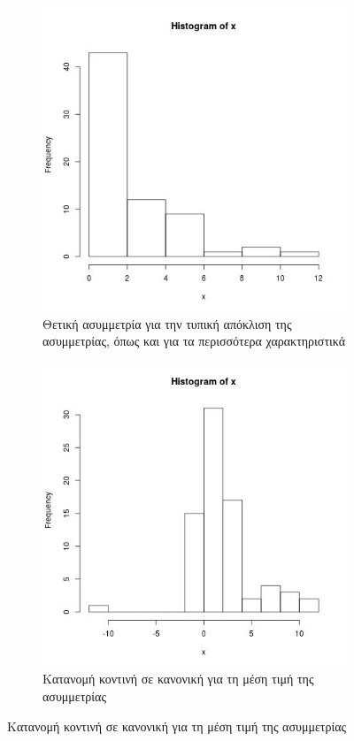 \documentclass[]{article}
\numberwithin{equation}{section}		%
\numberwithin{figure}{section}			%
\numberwithin{table}{section}				%
\begin{document}
\begin{figure}[H]
    	\medskip
    	\begin{subfigure}{0.48\textwidth}
    		\includegraphics[width=\linewidth, height = 0.2\textheight]{SkewnessSTD_scatter.jpg}
    		\caption{Θετική ασυμμετρία για την τυπική απόκλιση της ασυμμετρίας, όπως και για τα περισσότερα χαρακτηριστικά } \label{fig:c}
    	\end{subfigure}\hspace*{\fill}
    	\begin{subfigure}{0.48\textwidth}
    		\includegraphics[width=\linewidth, height = 0.2\textheight]{SkewnessMean_scatter.jpg}
    		\caption{Κατανομή κοντινή σε κανονική για τη μέση τιμή της ασυμμετρίας} \label{fig:d}
    	\end{subfigure}
    	

\end{figure}
\end{document}
